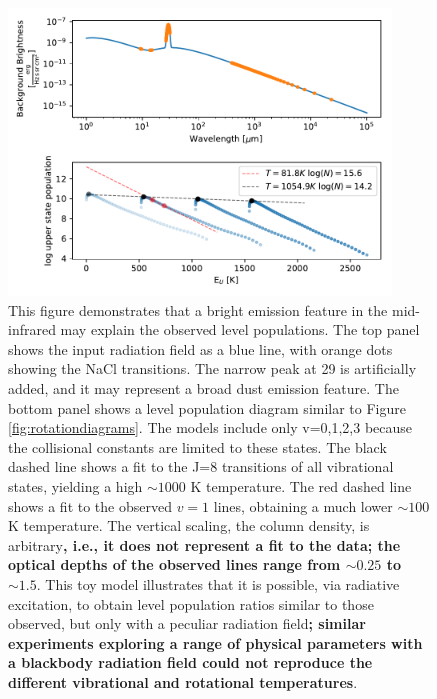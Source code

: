 \documentclass[twocolumn]{aastex62}
\newcommand{\referee}[1]{\textbf{#1}}
\begin{document}
\begin{figure}[!htp]
\includegraphics[scale=1,width=4in]{figures/simulated_populations_with_wacky_radiation_field.pdf}
\caption{This figure demonstrates that a bright emission feature in the mid-infrared may
explain the observed level populations.  The top panel shows the input radiation field as a blue
line, with orange dots showing the NaCl transitions.  The narrow peak at 29 \um is artificially
added, and it may represent a broad dust emission feature.
The bottom panel shows a level population diagram similar to Figure \ref{fig:rotationdiagrams}.
The models include only v=0,1,2,3 because the collisional constants are limited to these states.
The black dashed line shows a fit to the J=8 transitions of all vibrational states, yielding a high
$\sim1000$ K temperature.  The red dashed line shows a fit to the observed $v=1$ lines, obtaining a
much lower $\sim100$ K temperature.  The vertical scaling, the column density, is arbitrary\referee{, i.e., it
does not represent a fit to the data; the optical depths of the observed lines range from $\sim0.25$ to $\sim1.5$}.
This toy model illustrates that it is possible, via radiative excitation, to obtain level
population ratios similar to those observed, but only with a peculiar radiation field\referee{; similar
experiments exploring a range of physical parameters with a blackbody radiation field could not reproduce
the different vibrational and rotational temperatures}.
}
\label{fig:naclexcitationmodel}
\end{figure}
\end{document}
